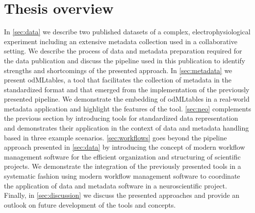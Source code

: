 \section{Thesis overview}
In \cref{sec:data} we describe two published datasets of a complex, electrophysiological experiment including an extensive metadata collection used in a collaborative setting. We describe the process of data and metadata preparation required for the data publication and discuss the pipeline used in this publication to identify strengths and shortcomings of the presented approach. In \cref{sec:metadata} we present odMLtables, a tool that facilitates the collection of metadata in the standardized  format and that emerged from the implementation of the previously presented pipeline. We demonstrate the embedding of odMLtables in a real-world metadata application and highlight the  features of the tool. \cref{sec:neo} complements the previous section by introducing tools for standardized data representation and demonstrates their application in the context of data and metadata handling based in three example scenarios. \cref{sec:workflows} goes beyond the pipeline approach presented in \cref{sec:data} by introducing the concept of modern workflow management software for the efficient organization and structuring of scientific projects. We demonstrate the integration of the previously presented tools in a systematic fashion using modern workflow management software to coordinate the application of data and metadata software in a neuroscientific project. Finally, in \cref{sec:discussion} we discuss the presented approaches and provide an outlook on future development of the tools and concepts.












































